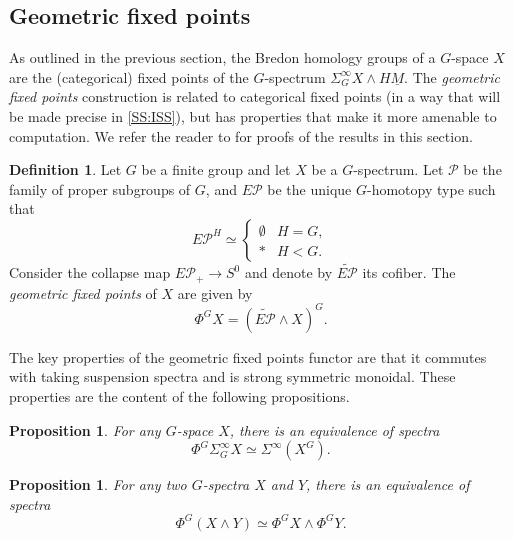 \documentclass[11pt]{amsart}
\newtheorem{proposition}[equation]{Proposition}
\theoremstyle{definition}
\newtheorem{definition}[equation]{Definition}
\numberwithin{equation}{subsection} %
\def\cf{\mathcal{F}}
\def\uM{\underline{M}}
\def\uA{\underline{A}}
\def\uM{\underline{M}}
\newcommand{\sma}{\wedge}
\newcommand{\sus}{\Sigma}
\begin{document}
\subsection{Geometric fixed points}\label{SS:GFP}

As outlined in the previous section, the Bredon homology groups of a $G$-space $X$ are the (categorical) fixed points of the $G$-spectrum $\sus^\infty_G X\sma H\uM$. The \emph{geometric fixed points} construction is related to categorical fixed points (in a way that will be made precise in \cref{SS:ISS}), but has properties that make it more amenable to computation. We refer the reader to \cite[Sec. 2.5]{HHR16} for proofs of the results in this section. 

\begin{definition} \label{Def:PhiG}
Let $G$ be a finite group and let $X$ be a $G$-spectrum. Let $\mathcal{P}$ be the family of proper subgroups of $G$, and $E\mathcal{P}$ be the unique $G$-homotopy type such that
$$ E\mathcal{P}^H \simeq \begin{cases} \emptyset & H=G, \\ * & H<G. \end{cases} $$
Consider the collapse map $E\mathcal P_+\to S^0$ and denote by $\widetilde{E\mathcal P}$ its cofiber. The \emph{geometric fixed points} of $X$ are given by
$$\Phi^GX = (\widetilde{E\mathcal{P}} \wedge X)^G. $$
\end{definition}

The key properties of the geometric fixed points functor are that it commutes with taking suspension spectra and is strong symmetric monoidal. These properties are the content of the following propositions. 

\begin{proposition}
For any $G$-space $X$, there is an equivalence of spectra
$$\Phi^G \Sigma^\infty_G X \simeq \Sigma^\infty(X^G).$$
\end{proposition}

\begin{proposition}
For any two $G$-spectra $X$ and $Y$, there is an equivalence of spectra
$$\Phi^G( X \wedge Y) \simeq \Phi^G X \wedge \Phi^G Y.$$
\end{proposition}


\end{document}

